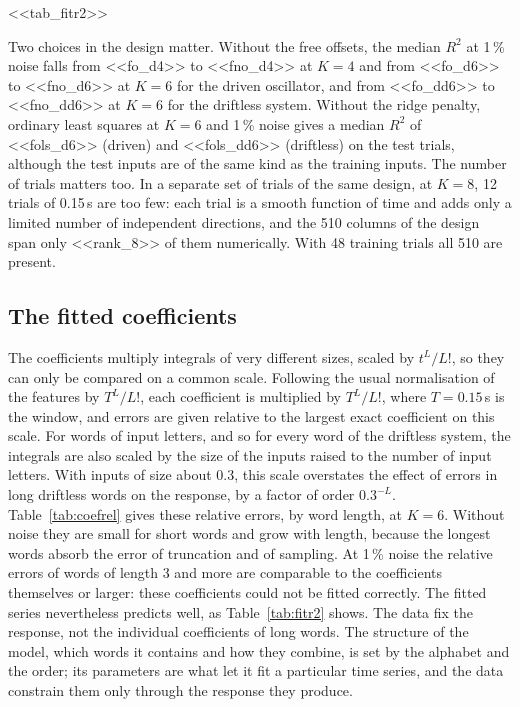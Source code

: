 \documentclass[11pt,a4paper]{article}
\theoremstyle{remark}
\begin{document}
\begin{table}[t]\centering\small
\caption{$R^2$ on the test trials of the fitted series (median over <<fs_seeds>> noise draws). Noise: standard deviation as a percentage of that of the response.}\label{tab:fitr2}
<<tab_fitr2>>
\end{table}

Two choices in the design matter.
Without the free offsets, the median $R^2$ at 1\,\% noise falls from <<fo_d4>> to <<fno_d4>> at $K=4$ and from <<fo_d6>> to <<fno_d6>> at $K=6$ for the driven oscillator, and from <<fo_dd6>> to <<fno_dd6>> at $K=6$ for the driftless system.
Without the ridge penalty, ordinary least squares at $K=6$ and 1\,\% noise gives a median $R^2$ of <<fols_d6>> (driven) and <<fols_dd6>> (driftless) on the test trials, although the test inputs are of the same kind as the training inputs.
The number of trials matters too.
In a separate set of trials of the same design, at $K=8$, 12 trials of 0.15\,s are too few: each trial is a smooth function of time and adds only a limited number of independent directions, and the 510 columns of the design span only <<rank_8>> of them numerically. With 48 training trials all 510 are present.

\subsection{The fitted coefficients}
The coefficients multiply integrals of very different sizes, scaled by $t^L/L!$, so they can only be compared on a common scale.
Following the usual normalisation of the features by $T^L/L!$, each coefficient is multiplied by $T^L/L!$, where $T=0.15$\,s is the window, and errors are given relative to the largest exact coefficient on this scale.
For words of input letters, and so for every word of the driftless system, the integrals are also scaled by the size of the inputs raised to the number of input letters.
With inputs of size about 0.3, this scale overstates the effect of errors in long driftless words on the response, by a factor of order $0.3^{-L}$.
Table~\ref{tab:coefrel} gives these relative errors, by word length, at $K=6$.
Without noise they are small for short words and grow with length, because the longest words absorb the error of truncation and of sampling.
At 1\,\% noise the relative errors of words of length 3 and more are comparable to the coefficients themselves or larger: these coefficients could not be fitted correctly.
The fitted series nevertheless predicts well, as Table~\ref{tab:fitr2} shows.
The data fix the response, not the individual coefficients of long words.
The structure of the model, which words it contains and how they combine, is set by the alphabet and the order; its parameters are what let it fit a particular time series, and the data constrain them only through the response they produce.
\end{document}

